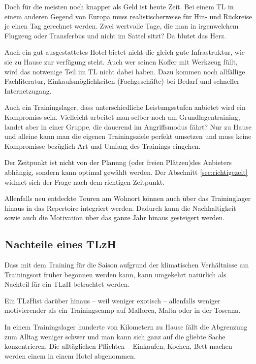 \documentclass[a4paper,DIV13,BCOR0cm]{scrartcl}
\newcommand{\tlzh}{TLzH}
\begin{document}

Doch für die meisten noch knapper als Geld ist heute Zeit.
Bei einem TL in einem anderen Gegend von Europa muss realistischerweise für Hin- und Rückreise je einen Tag gerechnet werden.
Zwei wertvolle Tage, die man in irgenwelchem Flugzeug oder Transferbus und nicht im Sattel sitzt?
Da blutet das Herz.

Auch ein gut ausgestattetes Hotel bietet nicht die gleich gute Infrastruktur, wie sie zu Hause zur verfügung steht.
Auch wer seinen Koffer mit Werkzeug füllt, wird das notwenige Teil im TL nicht dabei haben.
Dazu kommen noch allfällige Fachliteratur, Einkaufsmöglichkeiten (Fachgeschäfte) bei Bedarf und schneller Internetzugang.

Auch ein Trainingslager, dass unterschiedliche Leistungsstufen anbietet wird ein Kompromiss sein.
Vielleicht arbeitet man selber noch am Grundlagentraining, landet aber in einer Gruppe, die dauerend im Angriffsmodus fährt?
Nur zu Hause und alleine kann man die eigenen Trainingsziele perfekt umsetzen und muss keine Kompromisse bezüglich Art und Umfang des Trainings eingehen.

Der Zeitpunkt ist nicht von der Planung (oder freien Plätzen)des Anbieters abhängig, sondern kann optimal gewählt werden.
Der Abschnitt \ref{sec:richtigezeit} widmet sich der Frage nach dem richtigen Zeitpunkt.

Allenfalls neu entdeckte Touren am Wohnort können auch über das Traininglager hinaus in das Repertoire integriert werden.
Dadurch kann die Nachhaltigkeit sowie auch die Motivation über das ganze Jahr hinaus gesteigert werden.

\subsection{Nachteile eines \tlzh}

Dass mit dem Training für die Saison aufgrund der klimatischen Verhältnisse am Trainingsort früher begonnen werden kann,
kann umgekehrt natürlich als Nachteil für ein \tlzh{} betrachtet werden.

Ein \tlzh ist darüber hinaus -- weil weniger exotisch -- allenfalls weniger motivierender als ein Trainingscamp auf Mallorca, Malta oder in der Toscana.

In einem Trainingslager hunderte von Kilometern zu Hause fällt die Abgrenzung zum Alltag weniger schwer und
man kann sich ganz auf die gliebte Sache konzentrieren.
Die alltäglichen Pflichten -- Einkaufen, Kochen, Bett machen -- werden einem in einem Hotel abgenommen.
\end{document}

